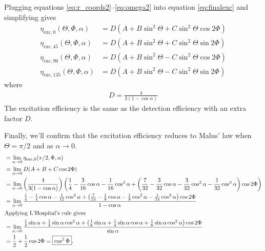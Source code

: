 \documentclass[11pt]{article}
\begin{document}
Plugging equations \ref{eq:r_coords2}--\ref{eq:omega2} into equation
\ref{eq:finalexc} and simplifying gives
\begin{subequations}
\begin{align}
  \eta_{\text{exc},0}(\Theta, \Phi, \alpha) &= D(A + B\sin^{2}{\Theta} + C\sin^{2}{\Theta} \cos{2 \Phi})\\
  \eta_{\text{exc},45}(\Theta, \Phi, \alpha) &= D(A + B\sin^{2}{\Theta} + C\sin^{2}{\Theta} \sin{2 \Phi})\\
  \eta_{\text{exc},90}(\Theta, \Phi, \alpha) &= D(A + B\sin^{2}{\Theta} - C\sin^{2}{\Theta} \cos{2 \Phi})\\
  \eta_{\text{exc},135}(\Theta, \Phi, \alpha) &= D(A + B\sin^{2}{\Theta} - C\sin^{2}{\Theta} \sin{2 \Phi})
\end{align}\label{eq:int2}
\end{subequations}
where
\vspace{-1em}
\begin{align}
  D = \frac{4}{3(1 - \cos\alpha)}
\end{align}\label{eq:coeff2}%
The excitation efficiency is the same as the detection efficiency with an extra
factor $D$.

Finally, we'll confirm that the excitation efficiency reduces to Malus' law when $\Theta = \pi/2$ and as $\alpha \rightarrow 0$.
\begin{align*}
  &=\lim_{\alpha\rightarrow 0} \eta_{\text{exc},0}(\pi/2, \Phi, \alpha)\\
  &= \lim_{\alpha\rightarrow 0}D(A + B + C\cos{2 \Phi})\\
  &= \lim_{\alpha\rightarrow 0} \left(\frac{4}{3(1-\cos\alpha)}\right)\left(\frac{1}{4} - \frac{3}{16} \cos{\alpha } - \frac{1}{16} \cos^{3}{\alpha } + \left(\frac{7}{32} - \frac{3}{32} \cos{\alpha } - \frac{3}{32} \cos^{2}{\alpha } - \frac{1}{32} \cos^{3}{\alpha}\right)\cos 2\Phi\right)\\
  &= \lim_{\alpha\rightarrow 0} \frac{\frac{1}{4} - \frac{1}{4} \cos{\alpha } - \frac{1}{12} \cos^{3}{\alpha } + \left(\frac{7}{24} - \frac{1}{8} \cos{\alpha } - \frac{1}{8} \cos^{2}{\alpha } - \frac{1}{24} \cos^{3}{\alpha}\right)\cos 2\Phi}{1 - \cos\alpha}\\
  \intertext{Applying L'Hospital's rule gives}
  &= \lim_{\alpha\rightarrow 0} \frac{\frac{1}{4} \sin{\alpha } + \frac{1}{4}\sin\alpha\cos^{2}{\alpha } + \left(\frac{1}{8} \sin{\alpha } + \frac{1}{4}\sin \alpha \cos{\alpha } + \frac{1}{8} \sin\alpha\cos^{2}{\alpha}\right)\cos 2\Phi}{\sin\alpha}\\
  &= \frac{1}{2} + \frac{1}{2}\cos2\Phi = \boxed{\cos^2{\Phi}}.
\end{align*}
\end{document}
